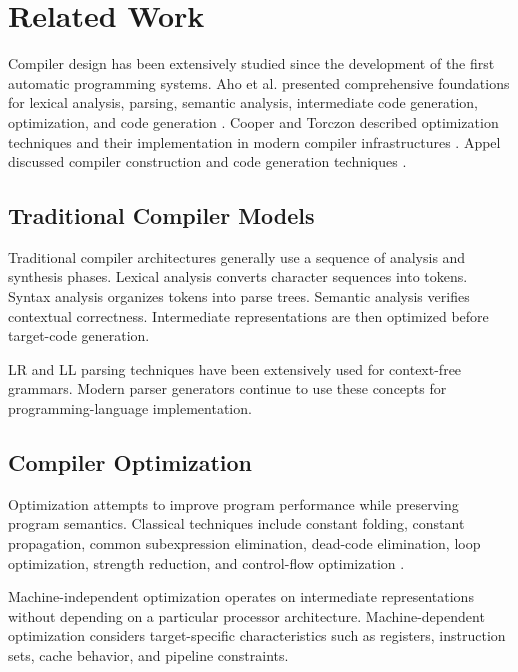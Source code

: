 \documentclass[12pt,a4paper]{article}
\begin{document}
\newpage

\section{Related Work}

Compiler design has been extensively studied since the development of the
first automatic programming systems. Aho et al. presented comprehensive
foundations for lexical analysis, parsing, semantic analysis, intermediate
code generation, optimization, and code generation \cite{aho2006}. Cooper and
Torczon described optimization techniques and their implementation in modern
compiler infrastructures \cite{cooper2007}. Appel discussed compiler
construction and code generation techniques \cite{appel2004}.

\subsection{Traditional Compiler Models}

Traditional compiler architectures generally use a sequence of analysis and
synthesis phases. Lexical analysis converts character sequences into tokens.
Syntax analysis organizes tokens into parse trees. Semantic analysis verifies
contextual correctness. Intermediate representations are then optimized before
target-code generation.

LR and LL parsing techniques have been extensively used for context-free
grammars. Modern parser generators continue to use these concepts for
programming-language implementation.

\subsection{Compiler Optimization}

Optimization attempts to improve program performance while preserving
program semantics. Classical techniques include constant folding, constant
propagation, common subexpression elimination, dead-code elimination, loop
optimization, strength reduction, and control-flow optimization
\cite{muchnick1997,click1995}.

Machine-independent optimization operates on intermediate representations
without depending on a particular processor architecture. Machine-dependent
optimization considers target-specific characteristics such as registers,
instruction sets, cache behavior, and pipeline constraints.
\end{document}
